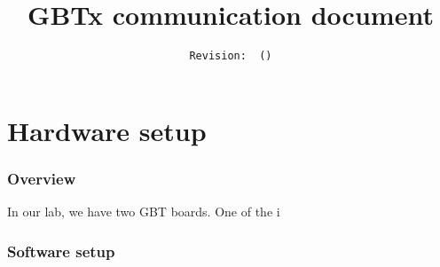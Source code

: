 \documentclass[11pt,letterpaper]{refart}
\title{GBTx communication document}
\author{\texttt{Revision\gitVtags: \gitAbbrevHash~(\gitAuthorData)}}
\begin{document}
\maketitle
\tableofcontents
\clearpage

\part{Hardware setup}
\section{Overview}
In our lab, we have two GBT boards. One of the i

\section{Software setup}
\end{document}
